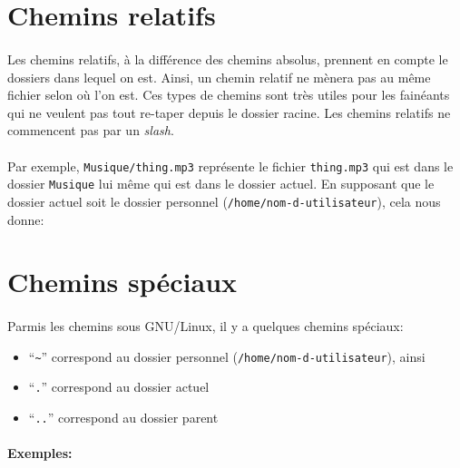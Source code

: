 \section{Chemins relatifs}

\paragraph{} Les chemins relatifs, à la différence des chemins absolus,
prennent en compte le dossiers dans lequel on est. Ainsi, un chemin relatif ne
mènera pas au même fichier selon où l'on est. Ces types de chemins sont très
utiles pour les fainéants qui ne veulent pas tout re-taper depuis le dossier
racine. Les chemins relatifs ne commencent pas par un \emph{slash}.

\paragraph{} Par exemple, \texttt{Musique/thing.mp3} représente le fichier
\texttt{thing.mp3} qui est dans le dossier \texttt{Musique} lui même qui est
dans le dossier actuel. En supposant que le dossier actuel soit le dossier
personnel (\texttt{/home/nom-d-utilisateur}), cela nous donne:
\\

\section{Chemins spéciaux}

\paragraph{} Parmis les chemins sous GNU/Linux, il y a quelques chemins
spéciaux:

\begin{itemize}
	\item ``\texttt{\~}'' correspond au dossier personnel
		(\texttt{/home/nom-d-utilisateur}), ainsi
	\item ``\texttt{.}'' correspond au dossier actuel\\
	\item ``\texttt{..}'' correspond au dossier parent\\
\end{itemize}

\paragraph{Exemples:}~\\

